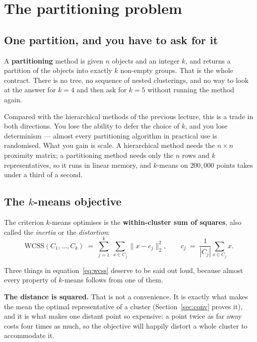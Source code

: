 \documentclass[11pt]{article}
\begin{document}
\section{The partitioning problem}
\label{sec:part}

\subsection{One partition, and you have to ask for it}

A \textbf{partitioning} method is given $n$ objects and an integer $k$, and
returns a partition of the objects into exactly $k$ non-empty groups. That is
the whole contract. There is no tree, no sequence of nested clusterings, and
no way to look at the answer for $k = 4$ and then ask for $k = 5$ without
running the method again.

Compared with the hierarchical methods of the previous lecture, this is a
trade in both directions. You lose the ability to defer the choice of $k$, and
you lose determinism --- almost every partitioning algorithm in practical use
is randomised. What you gain is scale. A hierarchical method needs the
$n \times n$ proximity matrix; a partitioning method needs only the $n$ rows
and $k$ representatives, so it runs in linear memory, and $k$-means on
$200{,}000$ points takes under a third of a second.

\subsection{The $k$-means objective}

The criterion $k$-means optimises is the \textbf{within-cluster sum of
squares}, also called the \emph{inertia} or the \emph{distortion}:
\begin{equation}
  \mathrm{WCSS}(C_1,\ldots,C_k)
  \;=\; \sum_{j=1}^{k}\ \sum_{x \in C_j} \lVert x - c_j \rVert_2^2,
  \qquad
  c_j \;=\; \frac{1}{|C_j|}\sum_{x \in C_j} x .
  \label{eq:wcss}
\end{equation}

Three things in equation~\eqref{eq:wcss} deserve to be said out loud, because
almost every property of $k$-means follows from one of them.

\textbf{The distance is squared.} That is not a convenience. It is exactly
what makes the mean the optimal representative of a cluster
(Section~\ref{sec:conv} proves it), and it is what makes one distant point so
expensive: a point twice as far away costs four times as much, so the
objective will happily distort a whole cluster to accommodate it.
\end{document}
